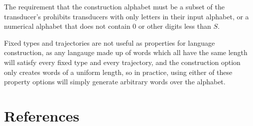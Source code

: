 \documentclass{article}
\begin{document}
\par The requirement that the construction alphabet must be a subset of the transducer's prohibits transducers with only letters in their input alphabet, or a numerical alphabet that does not contain 0 or other digits less than $S$.

\par Fixed types and trajectories are not useful as properties for language construction, as any langauge made up of words which all have the same length will satisfy every fixed type and every trajectory, and the construction option only creates words of a uniform length, so in practice, using either of these property options will simply generate arbitrary words over the alphabet.
\section{References}
\printbibliography
\end{document}
